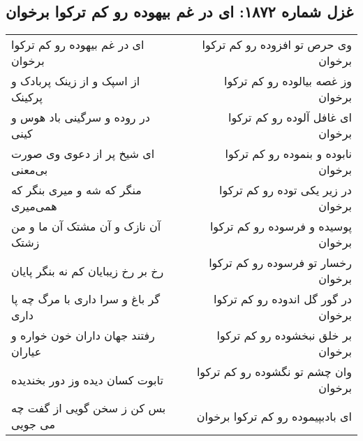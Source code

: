 \begin{center}
\section*{غزل شماره ۱۸۷۲: ای در غم بیهوده رو کم ترکوا برخوان}
\label{sec:1872}
\begin{longtable}{l p{0.5cm} r}
ای در غم بیهوده رو کم ترکوا برخوان
&&
وی حرص تو افزوده رو کم ترکوا برخوان
\\
از اسپک و از زینک پربادک و پرکینک
&&
وز غصه بیالوده رو کم ترکوا برخوان
\\
در روده و سرگینی باد هوس و کینی
&&
ای غافل آلوده رو کم ترکوا برخوان
\\
ای شیخ پر از دعوی وی صورت بی‌معنی
&&
نابوده و بنموده رو کم ترکوا برخوان
\\
منگر که شه و میری بنگر که همی‌میری
&&
در زیر یکی توده رو کم ترکوا برخوان
\\
آن نازک و آن مشتک آن ما و من زشتک
&&
پوسیده و فرسوده رو کم ترکوا برخوان
\\
رخ بر رخ زیبایان کم نه بنگر پایان
&&
رخسار تو فرسوده رو کم ترکوا برخوان
\\
گر باغ و سرا داری با مرگ چه پا داری
&&
در گور گل اندوده رو کم ترکوا برخوان
\\
رفتند جهان داران خون خواره و عیاران
&&
بر خلق نبخشوده رو کم ترکوا برخوان
\\
تابوت کسان دیده وز دور بخندیده
&&
وان چشم تو نگشوده رو کم ترکوا برخوان
\\
بس کن ز سخن گویی از گفت چه می جویی
&&
ای بادبپیموده رو کم ترکوا برخوان
\\
\end{longtable}
\end{center}
